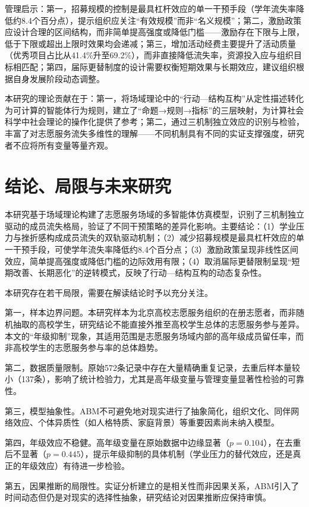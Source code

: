 \documentclass[12pt,a4paper]{article}
\begin{document}
管理启示：第一，招募规模的控制是最具杠杆效应的单一干预手段（学年流失率降低约8.4个百分点），提示组织应关注“有效规模”而非“名义规模”；第二，激励政策应设计合理的区间结构，而非简单提高强度或降低门槛——激励存在下限与上限，低于下限或超出上限时效果均会递减；第三，增加活动经费主要提升了活动质量（优秀项目占比从41.4\%升至69.2\%），而非直接降低流失率，资源投入应与组织目标相匹配；第四，届际更替制度的设计需要权衡短期效果与长期效应，建议组织根据自身发展阶段动态调整。

本研究的理论贡献在于：第一，将场域理论中的“行动—结构互构”从定性描述转化为可计算的智能体行为规则，建立了“命题→规则→指标”的三层映射，为计算社会科学中社会理论的操作化提供了参考；第二，通过三机制独立效应的识别与检验，丰富了对志愿服务流失多维性的理解——不同机制具有不同的实证支撑强度，研究者不应将所有变量等量齐观。

\section{结论、局限与未来研究}

本研究基于场域理论构建了志愿服务场域的多智能体仿真模型，识别了三机制独立驱动的成员流失格局，验证了不同干预策略的差异化影响。主要结论：（1）学业压力与挫折感构成成员流失的双轨驱动机制；（2）减少招募规模是最具杠杆效应的单一干预手段，可使学年流失率降低约8.4个百分点；（3）激励政策呈现非线性区间效应，简单提高强度或降低门槛的边际效用有限；（4）取消届际更替限制呈现“短期改善、长期恶化”的逆转模式，反映了行动—结构互构的动态复杂性。

本研究存在若干局限，需要在解读结论时予以充分关注。

第一，样本边界问题。本研究样本为北京高校志愿服务组织的在册志愿者，而非随机抽取的高校学生，研究结论不能直接外推至高校学生总体的志愿服务参与差异。本文的“年级抑制”现象，其适用范围是志愿服务场域内部的高年级成员留任率，而非高校学生的志愿服务参与率的总体趋势。

第二，数据质量限制。原始572条记录中存在大量精确重复记录，去重后样本量较小（137条），影响了统计检验力，尤其是高年级变量与管理变量显著性检验的可靠性。

第三，模型抽象性。ABM不可避免地对现实进行了抽象简化，组织文化、同伴网络效应、个体异质性（如人格特质、家庭背景）等重要因素尚未纳入模型。

第四，年级效应不稳健。高年级变量在原始数据中边缘显著（$p=0.104$），在去重后不显著（$p=0.445$），提示年级抑制的具体机制（学业压力的替代效应，还是真正的年级效应）有待进一步检验。

第五，因果推断的局限性。实证分析建立的是相关性而非因果关系，ABM引入了时间动态但仍是对现实的选择性抽象，研究结论对因果推断应保持审慎。
\end{document}
